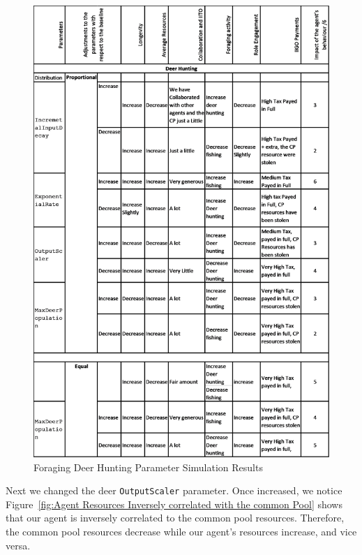 \newpage
\begin{figure} [!htb]
    \centering
    \includegraphics[width=1\textwidth]{13_team5_agentdesign/images/Foarging Simulation Deer Hunting.png}
    \caption{Foraging Deer Hunting Parameter Simulation Results}
    \label{fig:Foraging Deer Hunting Parameter Simulation Results}
\end{figure}

\newpage
Next we changed the deer \texttt{OutputScaler} parameter. Once increased, we notice Figure~\ref{fig:Agent Resources Inversely correlated with the common Pool} shows that our agent is inversely correlated to the common pool resources. Therefore, the common pool resources decrease while our agent's resources increase, and vice versa.


